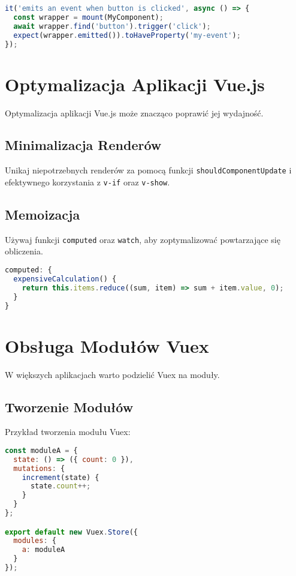 \documentclass[a4paper,12pt]{article}
\begin{document}
\begin{lstlisting}[language=JavaScript]
it('emits an event when button is clicked', async () => {
  const wrapper = mount(MyComponent);
  await wrapper.find('button').trigger('click');
  expect(wrapper.emitted()).toHaveProperty('my-event');
});
\end{lstlisting}

\section{Optymalizacja Aplikacji Vue.js}
Optymalizacja aplikacji Vue.js może znacząco poprawić jej wydajność.

\subsection{Minimalizacja Renderów}
Unikaj niepotrzebnych renderów za pomocą funkcji \texttt{shouldComponentUpdate} i efektywnego korzystania z \texttt{v-if} oraz \texttt{v-show}.

\subsection{Memoizacja}
Używaj funkcji \texttt{computed} oraz \texttt{watch}, aby zoptymalizować powtarzające się obliczenia.

\begin{lstlisting}[language=JavaScript]
computed: {
  expensiveCalculation() {
    return this.items.reduce((sum, item) => sum + item.value, 0);
  }
}
\end{lstlisting}

\section{Obsługa Modułów Vuex}
W większych aplikacjach warto podzielić Vuex na moduły.

\subsection{Tworzenie Modułów}
Przykład tworzenia modułu Vuex:

\begin{lstlisting}[language=JavaScript]
const moduleA = {
  state: () => ({ count: 0 }),
  mutations: {
    increment(state) {
      state.count++;
    }
  }
};

export default new Vuex.Store({
  modules: {
    a: moduleA
  }
});
\end{lstlisting}
\end{document}
